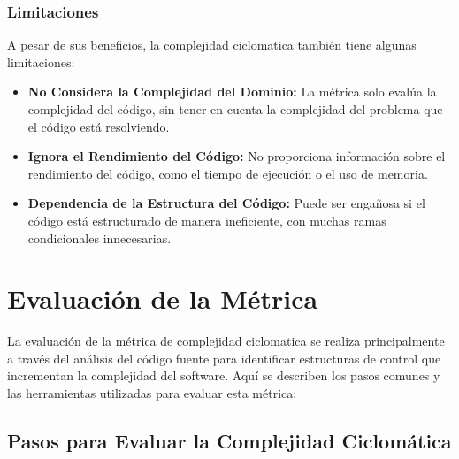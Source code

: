 \documentclass[10pt,authoryear,onecolumn]{article}
\begin{document}
\subsubsection{Limitaciones}
A pesar de sus beneficios, la complejidad ciclomatica también tiene algunas limitaciones:
\begin{itemize}
    \item \textbf{No Considera la Complejidad del Dominio:} La métrica solo evalúa la complejidad del código, sin tener en cuenta la complejidad del problema que el código está resolviendo.
    \item \textbf{Ignora el Rendimiento del Código:} No proporciona información sobre el rendimiento del código, como el tiempo de ejecución o el uso de memoria.
    \item \textbf{Dependencia de la Estructura del Código:} Puede ser engañosa si el código está estructurado de manera ineficiente, con muchas ramas condicionales innecesarias.
\end{itemize}

\section{Evaluación de la Métrica}

La evaluación de la métrica de complejidad ciclomatica se realiza principalmente a través del análisis del código fuente para identificar estructuras de control que incrementan la complejidad del software. Aquí se describen los pasos comunes y las herramientas utilizadas para evaluar esta métrica:

\subsection{Pasos para Evaluar la Complejidad Ciclomática}
\end{document}
